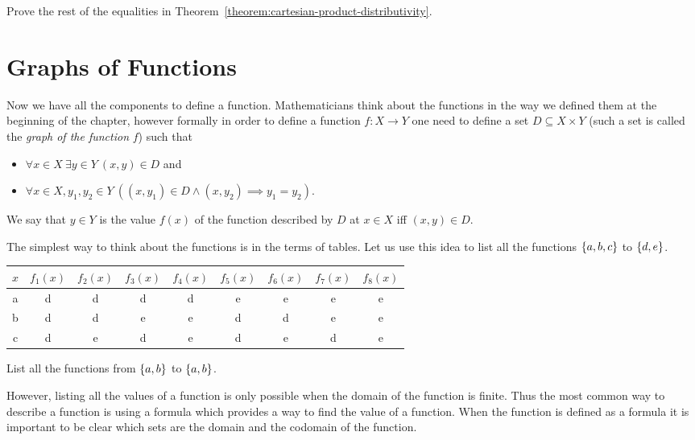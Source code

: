 \begin{exercise}
\label{exercise:cartesian-product-distributivity}
  Prove the rest of the equalities in
  Theorem~\ref{theorem:cartesian-product-distributivity}.
\end{exercise}


\section{Graphs of Functions}
\label{section:graph}
Now we have all the components to define a function. Mathematicians think about
the functions in the way we defined them at the beginning of the chapter,
however formally in order to define a function $f : X \to Y$ one need to define
a set $D \subseteq X \times Y$ (such a set is called the \textit{graph of the
function} $f$) such that
\begin{itemize}
  \item $\forall x \in X~\exists y \in Y\ (x, y) \in D$ and
  \item $\forall x \in X, y_1, y_2 \in Y\
    ((x, y_1) \in D \land (x, y_2) \implies y_1 = y_2)$.
\end{itemize}
We say that $y \in Y$ is the value $f(x)$ of the function described by $D$ at
$x \in X$ iff $(x, y) \in D$.

The simplest way to think about the functions is in the terms of tables.
Let us use this idea to list all the functions $\set{a, b, c}$ to $\set{d, e}$.
\begin{center}
  \begin{tabular}{c | c | c | c | c | c | c | c | c}
    $x$ & $f_1(x)$ & $f_2(x)$ & $f_3(x)$ & $f_4(x)$ & $f_5(x)$ & $f_6(x)$ &
    $f_7(x)$ & $f_8(x)$ \\
    \hline
    a & d & d & d & d & e & e & e & e \\
    b & d & d & e & e & d & d & e & e \\
    c & d & e & d & e & d & e & d & e
  \end{tabular}
\end{center}

\begin{exercise}
  List all the functions from $\set{a, b}$ to $\set{a, b}$.
\end{exercise}

However, listing all the values of a function is only possible when the domain
of the function is finite. Thus the most common way to describe a function is
using a formula which provides a way to find the value of a function. When the
function is defined as a formula it is important to be clear which sets are the
domain and the codomain of the function.

